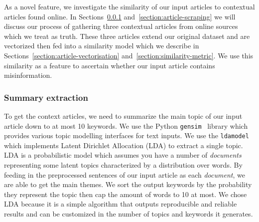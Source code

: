 \documentclass{article}
\begin{document}

As a novel feature, we investigate the similarity of our input articles to contextual articles found online. In Sections~\ref{section:summary-extraction} and~\ref{section:article-scraping} we will discuss our process of gathering three contextual articles from online sources which we treat as truth. These three articles extend our original dataset and are vectorized then fed into a similarity model which we describe in Sections~\ref{section:article-vectorisation} and~\ref{section:similarity-metric}. We use this similarity as a feature to ascertain whether our input article contains misinformation.

\subsubsection{Summary extraction} \label{section:summary-extraction}

To get the context articles, we need to summarize the main topic of our input article down to at most 10 keywords. We use the Python \verb|gensim|~\cite{py-gensim} library which provides various topic modelling interfaces for text inputs. We use the \verb|ldamodel| which implements Latent Dirichlet Allocation (LDA) to extract a single topic. LDA is a probabilistic model which assumes you have a number of \emph{documents} representing some latent topics characterized by a distribution over words. By feeding in the preprocessed sentences of our input article as each \emph{document}, we are able to get the main themes. We sort the output keywords by the probability they represent the topic then cap the amount of words to 10 at most. We chose LDA because it is a simple algorithm that outputs reproducible and reliable results and can be customized in the number of topics and keywords it generates.
\end{document}
